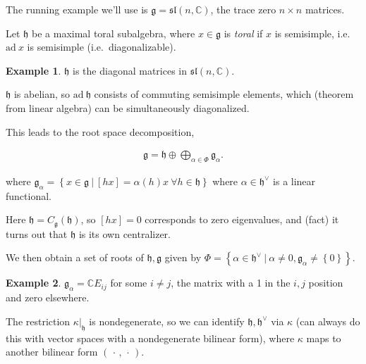 \documentclass[11pt]{scrartcl}
\theoremstyle{definition}
\theoremstyle{theorem}
\theoremstyle{proof}
\theoremstyle{definition}
\theoremstyle{break}
\newtheorem{example}{Example}[section]
\theoremstyle{problem}
\providecommand{\tightlist}{%
  \setlength{\itemsep}{0pt}\setlength{\parskip}{0pt}}
\newcommand{\CC}[0]{{\mathbb{C}}}
\newcommand{\ad}[0]{\mathrm{ad}~}
\newcommand{\dual}[0]{^\vee}
\newcommand{\lieg}[0]{{\mathfrak{g}}}
\newcommand{\lieh}[0]{{\mathfrak{h}}}
\newcommand{\liesl}[0]{{\mathfrak{sl}}}
\newcommand{\restrictionof}[2]{{\left.{#1}\right|_{#2}}}
\newcommand{\suchthat}[0]{{~\mathrel{\Big|}~}}
\newcommand{\theset}[1]{\left\{{#1}\right\}}
\newcommand{\wait}[0]{{\,\cdot\,}}
\begin{document}
The running example we'll use is \(\lieg = \liesl(n, \CC)\), the trace
zero \(n\times n\) matrices.

Let \(\lieh\) be a maximal toral subalgebra, where \(x\in\lieg\) is
\emph{toral} if \(x\) is semisimple, i.e.~\(\ad x\) is semisimple
(i.e.~diagonalizable).

\begin{example}

\(\lieh\) is the diagonal matrices in \(\liesl(n, \CC)\).\end{example}

\begin{description}
\tightlist
\item[Fact]
\(\lieh\) is abelian, so \(\ad \lieh\) consists of commuting semisimple
elements, which (theorem from linear algebra) can be simultaneously
diagonalized.
\end{description}

This leads to the root space decomposition,

\begin{align*}
\lieg = \lieh \oplus \bigoplus_{\alpha\in \Phi} \lieg_\alpha
.\end{align*}

where
\(\lieg_\alpha = \theset{x\in \lieg \suchthat [h x] = \alpha(h) x ~\forall h\in \lieh}\)
where \(\alpha \in \lieh\dual\) is a linear functional.

Here \(\lieh = C_\lieg(\lieh)\), so \([h x] = 0\) corresponds to zero
eigenvalues, and (fact) it turns out that \(\lieh\) is its own
centralizer.

We then obtain a set of roots of \(\lieh, \lieg\) given by
\(\Phi = \theset{\alpha\in\lieh\dual \suchthat \alpha\neq 0, \lieg_\alpha \neq \theset{0}}\).

\begin{example}

\(\lieg_\alpha = \CC E_{ij}\) for some \(i\neq j\), the matrix with a 1
in the \(i,j\) position and zero elsewhere.\end{example}

\begin{description}
\tightlist
\item[Fact]
The restriction \(\restrictionof{\kappa}{\lieh}\) is nondegenerate, so
we can identify \(\lieh, \lieh\dual\) via \(\kappa\) (can always do this
with vector spaces with a nondegenerate bilinear form), where \(\kappa\)
maps to another bilinear form \((\wait, \wait)\).
\end{description}
\end{document}

